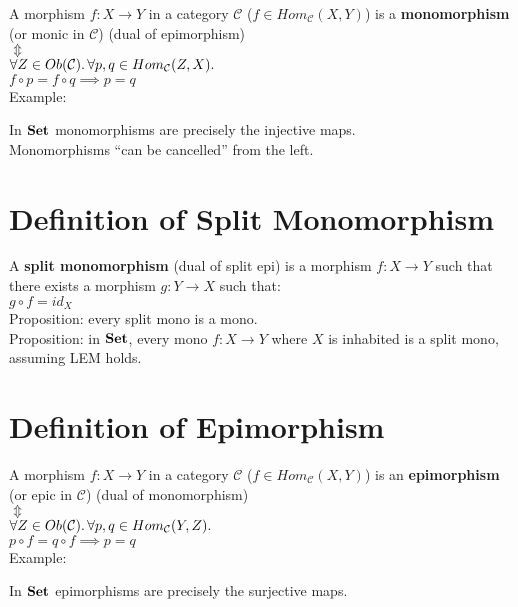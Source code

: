 \documentclass[a4paper, twoside, english, 11pt]{book}
\newcommand{\C}{\mathcal C}
\newcommand{\catname}[1]{{\normalfont\textbf{#1}}}
\newcommand{\Set}{\catname{Set}}
\begin{document}
A morphism $f : X \rightarrow Y$ in a category $\C$ ($f \in Hom_\C(X, Y)$) is a \textbf{monomorphism} (or monic in $\C$) (dual of epimorphism) \\
\indent
$\Updownarrow$ \\ %
$\forall Z \in Ob(\C) \ldotp \forall p, q \in Hom_\C(Z, X) \ldotp$ \\
$f \circ p = f \circ q \implies p = q$ \\

\noindent
Example:

In $\Set$ monomorphisms are precisely the injective maps. \\

\noindent
Monomorphisms ``can be cancelled'' from the left.



\section{Definition of Split Monomorphism}

A \textbf{split monomorphism} (dual of split epi) is a morphism $f : X \rightarrow Y$ such that there exists a morphism $g : Y \rightarrow X$ such that: \\

$g \circ f = id_X$ \\

\noindent
Proposition: every split mono is a mono. \\
Proposition: in $\Set$, every mono $f : X \rightarrow Y$ where $X$ is inhabited is a split mono, assuming LEM holds.



\section{Definition of Epimorphism}

A morphism $f : X \rightarrow Y$ in a category $\C$ ($f \in Hom_\C(X, Y)$) is an \textbf{epimorphism} (or epic in $\C$) (dual of monomorphism) \\
\indent
$\Updownarrow$ \\ %
$\forall Z \in Ob(\C) \ldotp \forall p, q \in Hom_\C(Y, Z) \ldotp$ \\
$p \circ f = q \circ f \implies p = q$ \\

\noindent
Example:

In $\Set$ epimorphisms are precisely the surjective maps. \\
\end{document}
